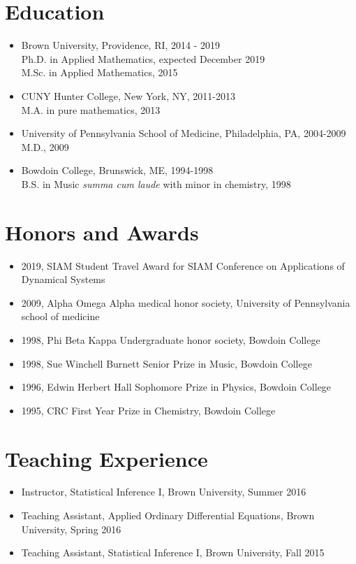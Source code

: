 \section*{Education}
\begin{itemize}
	\item Brown University, Providence, RI, 2014 - 2019\\
	Ph.D. in Applied Mathematics, expected December 2019 \\
	M.Sc. in Applied Mathematics, 2015

	\item CUNY Hunter College, New York, NY, 2011-2013\\
	M.A. in pure mathematics, 2013

	\item University of Pennsylvania School of Medicine, Philadelphia, PA, 2004-2009 \\
	M.D., 2009
	
	\item Bowdoin College, Brunswick, ME, 1994-1998 \\
	B.S. in Music \emph{summa cum laude} with minor in chemistry, 1998\\
\end{itemize}

\section*{Honors and Awards}

\begin{itemize}
	\item 2019, SIAM Student Travel Award for SIAM Conference on Applications of Dynamical Systems
	\item 2009, Alpha Omega Alpha medical honor society, University of Pennsylvania school of medicine
	\item 1998, Phi Beta Kappa Undergraduate honor society, Bowdoin College
	\item 1998, Sue Winchell Burnett Senior Prize in Music, Bowdoin College
	\item 1996, Edwin Herbert Hall Sophomore Prize in Physics, Bowdoin College
	\item 1995, CRC First Year Prize in Chemistry, Bowdoin College
\end{itemize}

\section*{Teaching Experience}
\begin{itemize}
	\item Instructor, Statistical Inference I, Brown University, Summer 2016
	\item Teaching Assistant, Applied Ordinary Differential Equations, Brown University, Spring 2016
	\item Teaching Assistant, Statistical Inference I, Brown University, Fall 2015
\end{itemize}


